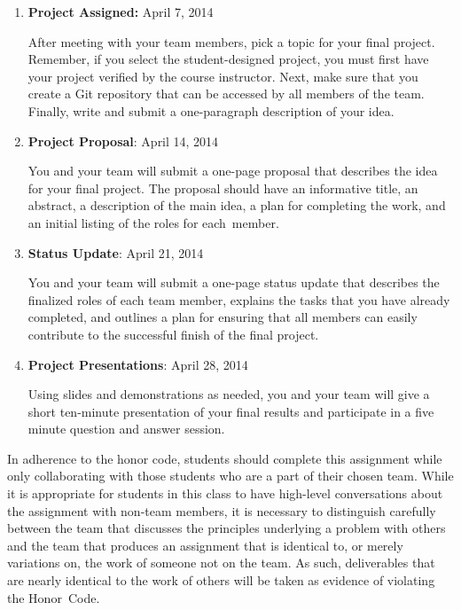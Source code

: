 \vspace*{-.05in}
\begin{enumerate}

  \itemsep0in

  \item {\bf Project Assigned:} April 7, 2014

    After meeting with your team members, pick a topic for your final project.  Remember, if you select the
    student-designed project, you must first have your project verified by the course instructor.  Next, make sure that
    you create a Git repository that can be accessed by all members of the team. Finally, write and submit a
    one-paragraph description of your idea.

  \item {\bf Project Proposal}: April 14, 2014

    You and your team will submit a one-page proposal that describes the idea for your final project.  The proposal
    should have an informative title, an abstract, a description of the main idea, a plan for completing the work, and
    an initial listing of the roles for \mbox{each member}. 

  \item {\bf Status Update}: April 21, 2014

    You and your team will submit a one-page status update that describes the finalized roles of each team member,
    explains the tasks that you have already completed, and outlines a plan for ensuring that all members can easily
    contribute to the successful finish of the final project.

  \item {\bf Project Presentations}: April 28, 2014

    Using slides and demonstrations as needed, you and your team will give a short ten-minute presentation of your final
    results and participate in a five minute question and answer session.

\end{enumerate}
\vspace*{-.05in}

In adherence to the honor code, students should complete this assignment while only collaborating with those students
who are a part of their chosen team. While it is appropriate for students in this class to have high-level
conversations about the assignment with non-team members, it is necessary to distinguish carefully between the team that
discusses the principles underlying a problem with others and the team that produces an assignment that is identical to,
or merely variations on, the work of someone not on the team.  As such, deliverables that are nearly identical to the
work of others will be taken as evidence of violating the \mbox{Honor Code}.  

  
